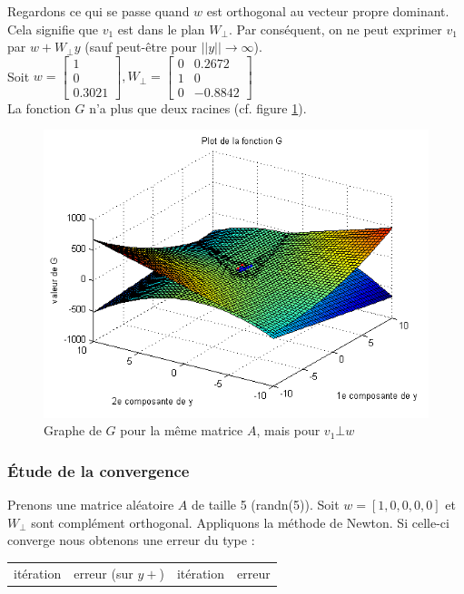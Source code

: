 Regardons ce qui se passe quand $w$ est orthogonal au vecteur propre dominant. Cela signifie que $v_1$ est dans le plan $W_\bot$. Par conséquent, on ne peut exprimer $v_1$ par $w+W_{\bot}y$ (sauf peut-être pour $||y|| \rightarrow \infty$). \\
Soit $w = 
\begin{bmatrix}
1 \\
0\\
0.3021
\end{bmatrix} , 
W_{\bot} =  
\begin{bmatrix}
0 & 0.2672 \\
1 & 0 \\
0 & -0.8842 
\end{bmatrix}$\\
La fonction $G$ n'a plus que deux racines (cf. figure \ref{FigNewtonv1inW}).

\begin{figure}
\centering
\includegraphics[width=12cm]{grapheG3.png}
\caption{Graphe de $G$ pour la même matrice $A$, mais pour $v_1 \bot w$  
}
\label{FigNewtonv1inW}
\end{figure}


\subsubsection{Étude de la convergence}
Prenons une matrice aléatoire $A$ de taille 5 (randn(5)). Soit $w=[1,0,0,0,0]$ et $W_{\bot}$ sont complément orthogonal. Appliquons la méthode de Newton. Si celle-ci converge nous obtenons une erreur du type : 
\begin{table}
\centering
\begin{tabular}{cccc}
itération & erreur (sur $y+$) & itération & erreur\\
\end{tabular}
\end{table}  

